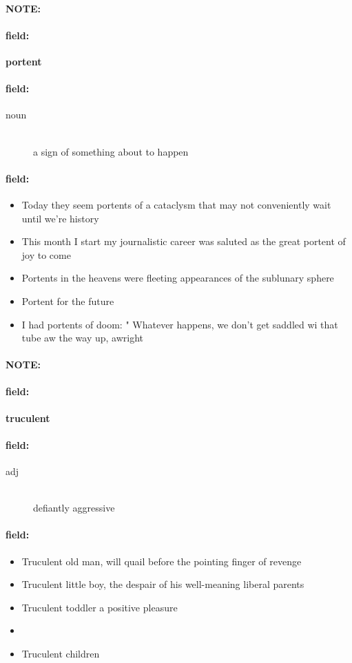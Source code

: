 \documentclass[12pt]{article}
\newenvironment{note}{\paragraph{NOTE:}}{}
\newenvironment{field}{\paragraph{field:}}{}
\begin{document}
\begin{note}
\begin{field}
\textbf{\large portent}
\end{field}


\begin{field}
\begin{description}
\item[noun] \hfill \\ 
a sign of something about to happen

\end{description}
\end{field}

\begin{field}
\begin{itemize}
\item Today they seem portents of a cataclysm that may not conveniently wait until we're history
\item This month I start my journalistic career was saluted as the great portent of joy to come
\item Portents in the heavens were fleeting appearances of the sublunary sphere
\item Portent for the future
\item I had portents of doom: " Whatever happens, we don't get saddled wi that tube aw the way up, awright
\end{itemize}
\end{field}
\end{note}
\begin{note}
\begin{field}
\textbf{\large truculent}
\end{field}


\begin{field}
\begin{description}
\item[adj] \hfill \\ 
defiantly aggressive

\end{description}
\end{field}

\begin{field}
\begin{itemize}
\item Truculent old man, will quail before the pointing finger of revenge
\item Truculent little boy, the despair of his well-meaning liberal parents
\item Truculent toddler a positive pleasure
\item 
\item Truculent children
\end{itemize}
\end{field}
\end{note}
\end{document}
